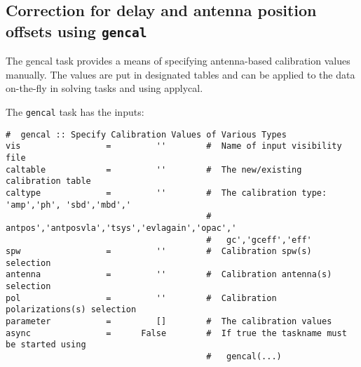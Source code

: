 \subsection{Correction for delay and antenna position offsets 
   using {\tt gencal}}
\label{section:cal.prior.gencal}


The gencal task provides a means of specifying antenna-based
calibration values manually.  The values are put in designated tables
and can be applied to the data on-the-fly in solving tasks and 
using applycal.

The {\tt gencal} task has the inputs:
\small
\begin{verbatim}
#  gencal :: Specify Calibration Values of Various Types
vis                 =         ''        #  Name of input visibility file
caltable            =         ''        #  The new/existing calibration table
caltype             =         ''        #  The calibration type: 'amp','ph', 'sbd','mbd','
                                        #   antpos','antposvla','tsys','evlagain','opac','
                                        #   gc','gceff','eff'
spw                 =         ''        #  Calibration spw(s) selection
antenna             =         ''        #  Calibration antenna(s) selection
pol                 =         ''        #  Calibration polarizations(s) selection
parameter           =         []        #  The calibration values
async               =      False        #  If true the taskname must be started using
                                        #   gencal(...)

\end{verbatim}
\normalsize


